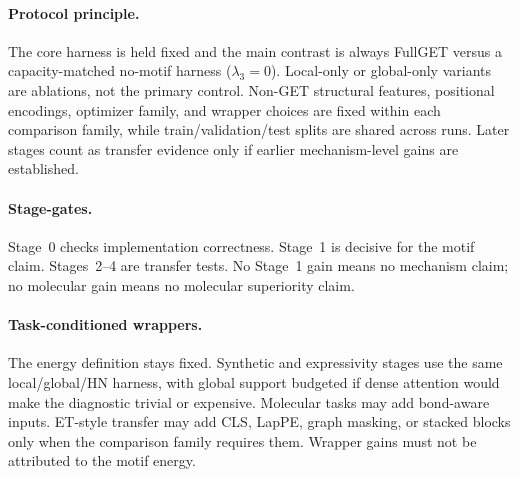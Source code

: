 \documentclass[11pt,a4paper]{article}
\begin{document}
\paragraph{Protocol principle.}
The core harness is held fixed and the main contrast is always FullGET versus a
capacity-matched no-motif harness ($\lambda_3=0$). Local-only or global-only
variants are ablations, not the primary control. Non-GET structural features,
positional encodings, optimizer family, and wrapper choices are fixed within
each comparison family, while train/validation/test splits are shared across
runs. Later stages count as transfer evidence only if earlier mechanism-level
gains are established.

\paragraph{Stage-gates.}
Stage~0 checks implementation correctness. Stage~1 is decisive for the motif
claim. Stages~2--4 are transfer tests. No Stage~1 gain means no mechanism
claim; no molecular gain means no molecular superiority claim.

\paragraph{Task-conditioned wrappers.}
The energy definition stays fixed. Synthetic and expressivity stages use the
same local/global/HN harness, with global support budgeted if dense attention
would make the diagnostic trivial or expensive. Molecular tasks may add
bond-aware inputs. ET-style transfer may add CLS, LapPE, graph masking, or
stacked blocks only when the comparison family requires them. Wrapper gains
must not be attributed to the motif energy.
\end{document}
